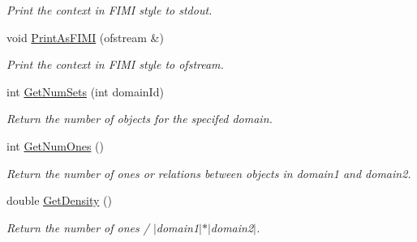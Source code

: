 \begin{DoxyCompactItemize}
\begin{DoxyCompactList}\small\item\em Print the context in FIMI style to stdout. \item\end{DoxyCompactList}\item 
\hypertarget{class_context_a15e5ec1fe7cddd0348c61f59733aed6e}{
void \hyperlink{class_context_a15e5ec1fe7cddd0348c61f59733aed6e}{PrintAsFIMI} (ofstream \&)}
\label{class_context_a15e5ec1fe7cddd0348c61f59733aed6e}

\begin{DoxyCompactList}\small\item\em Print the context in FIMI style to ofstream. \item\end{DoxyCompactList}\item 
\hypertarget{class_context_a17e73342fcd3d9cd96e2445e48c52275}{
int \hyperlink{class_context_a17e73342fcd3d9cd96e2445e48c52275}{GetNumSets} (int domainId)}
\label{class_context_a17e73342fcd3d9cd96e2445e48c52275}

\begin{DoxyCompactList}\small\item\em Return the number of objects for the specifed domain. \item\end{DoxyCompactList}\item 
\hypertarget{class_context_a54d9dcce403fb8f8f68118e6d420ce66}{
int \hyperlink{class_context_a54d9dcce403fb8f8f68118e6d420ce66}{GetNumOnes} ()}
\label{class_context_a54d9dcce403fb8f8f68118e6d420ce66}

\begin{DoxyCompactList}\small\item\em Return the number of ones or relations between objects in domain1 and domain2. \item\end{DoxyCompactList}\item 
\hypertarget{class_context_a1f3efbbcf1693d03bb6c4a8140312c83}{
double \hyperlink{class_context_a1f3efbbcf1693d03bb6c4a8140312c83}{GetDensity} ()}
\label{class_context_a1f3efbbcf1693d03bb6c4a8140312c83}

\begin{DoxyCompactList}\small\item\em Return the number of ones / $|$domain1$|$$\ast$$|$domain2$|$. \item\end{DoxyCompactList}\end{DoxyCompactItemize}
